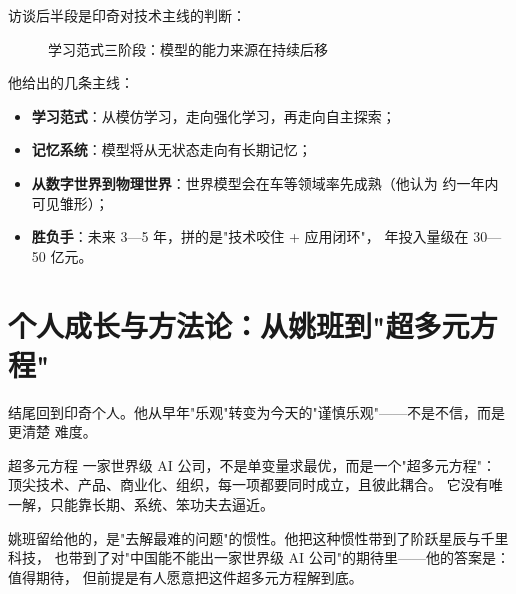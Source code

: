\documentclass[a4paper]{article}
\begin{document}
访谈后半段是印奇对技术主线的判断：

\begin{figure}[H]
\centering
{}
\caption{学习范式三阶段：模型的能力来源在持续后移}
\end{figure}

他给出的几条主线：
\begin{itemize}
    \item \textbf{学习范式}：从模仿学习，走向强化学习，再走向自主探索；
    \item \textbf{记忆系统}：模型将从无状态走向有长期记忆；
    \item \textbf{从数字世界到物理世界}：世界模型会在车等领域率先成熟（他认为
        约一年内可见雏形）；
    \item \textbf{胜负手}：未来 3—5 年，拼的是"技术咬住 + 应用闭环"，
        年投入量级在 30—50 亿元。
\end{itemize}

\section{个人成长与方法论：从姚班到"超多元方程"}

结尾回到印奇个人。他从早年"乐观"转变为今天的"谨慎乐观"——不是不信，而是更清楚
难度。

\begin{knowledgebox}{超多元方程}
一家世界级 AI 公司，不是单变量求最优，而是一个"超多元方程"：
顶尖技术、产品、商业化、组织，每一项都要同时成立，且彼此耦合。
它没有唯一解，只能靠长期、系统、笨功夫去逼近。
\end{knowledgebox}

姚班留给他的，是"去解最难的问题"的惯性。他把这种惯性带到了阶跃星辰与千里科技，
也带到了对"中国能不能出一家世界级 AI 公司"的期待里——他的答案是：值得期待，
但前提是有人愿意把这件超多元方程解到底。
\end{document}
